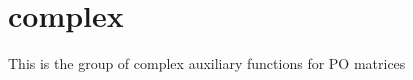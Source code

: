 \hypertarget{group__complexPOauxiliary}{}\section{complex}
\label{group__complexPOauxiliary}
This is the group of complex auxiliary functions for P\+O matrices 
